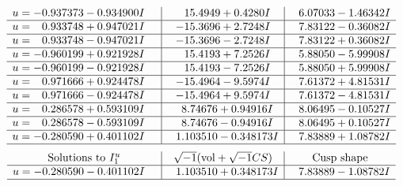 \documentclass[1p]{elsarticle_modified}
\theoremstyle{definition}
\newcommand{\I}{\sqrt{-1}}
\begin{document}
$$\begin{array}{c|c|c}
\begin{aligned}
u &= -0.937373 - 0.934900 I\end{aligned}
 & \phantom{-}15.4949 + 0.4280 I & \phantom{-}6.07033 - 1.46342 I \\ \hline\begin{aligned}
u &= \phantom{-}0.933748 + 0.947021 I\end{aligned}
 & -15.3696 + 2.7248 I & \phantom{-}7.83122 - 0.36082 I \\ \hline\begin{aligned}
u &= \phantom{-}0.933748 - 0.947021 I\end{aligned}
 & -15.3696 - 2.7248 I & \phantom{-}7.83122 + 0.36082 I \\ \hline\begin{aligned}
u &= -0.960199 + 0.921928 I\end{aligned}
 & \phantom{-}15.4193 + 7.2526 I & \phantom{-}5.88050 - 5.99908 I \\ \hline\begin{aligned}
u &= -0.960199 - 0.921928 I\end{aligned}
 & \phantom{-}15.4193 - 7.2526 I & \phantom{-}5.88050 + 5.99908 I \\ \hline\begin{aligned}
u &= \phantom{-}0.971666 + 0.924478 I\end{aligned}
 & -15.4964 - 9.5974 I & \phantom{-}7.61372 + 4.81531 I \\ \hline\begin{aligned}
u &= \phantom{-}0.971666 - 0.924478 I\end{aligned}
 & -15.4964 + 9.5974 I & \phantom{-}7.61372 - 4.81531 I \\ \hline\begin{aligned}
u &= \phantom{-}0.286578 + 0.593109 I\end{aligned}
 & \phantom{-}8.74676 + 0.94916 I & \phantom{-}8.06495 - 0.10527 I \\ \hline\begin{aligned}
u &= \phantom{-}0.286578 - 0.593109 I\end{aligned}
 & \phantom{-}8.74676 - 0.94916 I & \phantom{-}8.06495 + 0.10527 I \\ \hline\begin{aligned}
u &= -0.280590 + 0.401102 I\end{aligned}
 & \phantom{-}1.103510 - 0.348173 I & \phantom{-}7.83889 + 1.08782 I\\
 \hline 
 \end{array}$$\newpage$$\begin{array}{c|c|c}  
\text{Solutions to }I^u_{1}& \I (\text{vol} + \sqrt{-1}CS) & \text{Cusp shape}\\
 \hline 
\begin{aligned}
u &= -0.280590 - 0.401102 I\end{aligned}
 & \phantom{-}1.103510 + 0.348173 I & \phantom{-}7.83889 - 1.08782 I\\
 \hline 
 \end{array}$$\newpage
\end{document}
